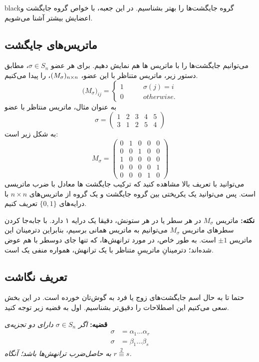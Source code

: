 \documentclass{article}
\begin{document}
\newpage
\begin{boxes}{black}{گروه جایگشت‌ها را بهتر بشناسیم.}
	در این جعبه، با خواص گروه جایگشت و اعضایش بیشتر آشنا می‌شویم.
	\subsection*{ماتریس‌های جایگشت}
	می‌توانیم جایگشت‌ها را با ماتریس ها هم نمایش دهیم. برای هر عضو $\sigma \in S_n$، مطابق دستور زیر، ماتریس متناظر با این عضو، 
	$(M_\sigma)_{\tiny n\times n}$، را پیدا می‌کنیم.
	\[
	\big(M_\sigma\big)_{ij} = \begin{cases}
		1 & \quad\quad \sigma(j) = i \\
		0 &\quad\quad {otherwise}.
	\end{cases}
	\]
	به عنوان مثال، ماتریس منتاظر با عضو
	\[
	\sigma =
	\begin{pmatrix}
		1 & 2 & 3 & 4 & 5 \\
		3 & 1 & 2 & 5 & 4 
	\end{pmatrix}
	\]
	به شکل زیر است:
	\[
	M_\sigma = \begin{pmatrix}
		0 & 1 & 0&0&0 \\
		0 & 0 &1&0&0 \\
		1&0&0&0&0 \\
		0&0&0&0&1\\
		0&0&0&1&0
	\end{pmatrix}
	\]
	می‌توانید با تعریف بالا مشاهده کنید که ترکیب جایگشت ها معادل با ضرب ماتریسی است. پس می‌توانید یک یکریختی بین گروه جایگشت و یک گروه از ماتریس‌های
	$n\times n$
	با درایه‌های 
	$\{0,1\}$
	تعریف کنیم.
	
	\textbf{نکته:}
	ماتریس 	$M_\sigma$ در هر سطر یا در هر ستونش، دقیقا یک درایه ۱ دارد.  با جابه‌جا کردن سطرهای ماتریس 
	$M_\sigma$
	می‌توانیم به ماتریس همانی برسیم، بنابراین دترمینان این ماتریس $\pm 1$ است. به طور خاص، در مورد ترانهش‌ها، که تنها جای دوسطر با هم عوض شده‌اند؛ دترمینانِ ماتریسِ متناظر با یک ترانهش، همواره منفی یک است.
	
	
	\subsection*{تعریف نگاشت
	}
	حتما تا به حال اسم جایگشت‌های زوج یا فرد به گوش‌تان خورده است. در این بخش سعی می‌کنیم این اصطلاحات را دقیق‌تر بشناسیم.
	اول به قضیه زیر توجه کنید.
	
	\vspace{0.6em}
	\textbf{قضیه:}
	\textit{اگر 
	$\sigma\in S_n$
	دارای دو تجزیه‌ی 
	\[
	\begin{aligned}
		\sigma &= \alpha_1 \dots \alpha_r \\
		\sigma &= \beta_1 \dots \beta_s
	\end{aligned}
	\]
	به حاصل‌ضرب ترانهش‌ها باشد؛ آنگاه 
	$r \stackrel{2}{\equiv} s$.
	}
	

\end{boxes}
\end{document}
